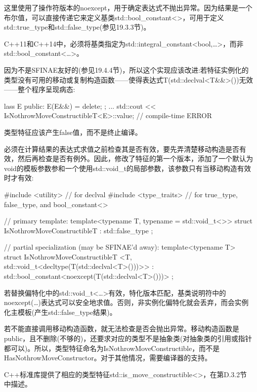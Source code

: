 这里使用了操作符版本的noexcept，用于确定表达式不抛出异常。因为结果是一个布尔值，可以直接传递它来定义基类std::bool\_constant<>，可用于定义std::true\_type和std::false\_type(参见19.3.3节)。

\begin{notice}
C++11和C++14中，必须将基类指定为std::integral\_constant<bool,…>，而非std::bool\_constant<…>。
\end{notice}

因为不是SFINAE友好的(参见19.4.4节)，所以这个实现应该改进:若特征实例化的类型没有可用的移动或复制构造函数——使得表达式T(std::declval<T\&\&>())无效——整个程序呈现病态:

\begin{cpp}
lass E {
	public:
	E(E&&) = delete;
};
...
std::cout << IsNothrowMoveConstructibleT<E>::value; // compile-time ERROR
\end{cpp}

类型特征应该产生false值，而不是终止编译。

必须在计算结果的表达式求值之前检查其是否有效，要先弄清楚移动构造是否有效，然后再检查是否有例外。因此，修改了特征的第一个版本，添加了一个默认为void的模板参数参和一个使用std::void\_t的局部参数，该参数只有当移动构造有效时才有效:

\begin{cpp}
#include <utility> // for declval
#include <type_traits> // for true_type, false_type, and bool_constant<>

// primary template:
template<typename T, typename = std::void_t<>>
struct IsNothrowMoveConstructibleT : std::false_type
{
};

// partial specialization (may be SFINAE’d away):
template<typename T>
struct IsNothrowMoveConstructibleT
		<T, std::void_t<decltype(T(std::declval<T>()))>>
: std::bool_constant<noexcept(T(std::declval<T>()))>
{
};
\end{cpp}

若替换偏特化中的std::void\_t<…>有效，特化版本匹配，基类说明符中的noexcept(…)表达式可以安全地求值。否则，非实例化偏特化就会丢弃，而会实例化主模板(产生std::false\_type结果)。

若不能直接调用移动构造函数，就无法检查是否会抛出异常。移动构造函数是public，且不删除(不够的)，还要求对应的类型不是抽象类(对抽象类的引用或指针都可以)。所以，类型特征命名为IsNothrowMoveConstructible，而不是HasNothrowMoveConstructor。对于其他情况，需要编译器的支持。 

C++标准库提供了相应的类型特征std::is\_move\_constructible<>，在第D.3.2节中描述。

